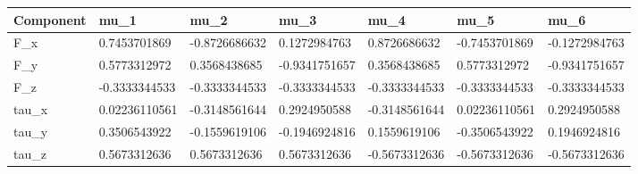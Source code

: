 \begin{tabular}{@{}lllllll@{}}
\toprule
Component & mu\_1 & mu\_2 & mu\_3 & mu\_4 & mu\_5 & mu\_6 \\
\midrule
F\_x & 0.7453701869 & -0.8726686632 & 0.1272984763 & 0.8726686632 & -0.7453701869 & -0.1272984763 \\
F\_y & 0.5773312972 & 0.3568438685 & -0.9341751657 & 0.3568438685 & 0.5773312972 & -0.9341751657 \\
F\_z & -0.3333344533 & -0.3333344533 & -0.3333344533 & -0.3333344533 & -0.3333344533 & -0.3333344533 \\
tau\_x & 0.02236110561 & -0.3148561644 & 0.2924950588 & -0.3148561644 & 0.02236110561 & 0.2924950588 \\
tau\_y & 0.3506543922 & -0.1559619106 & -0.1946924816 & 0.1559619106 & -0.3506543922 & 0.1946924816 \\
tau\_z & 0.5673312636 & 0.5673312636 & 0.5673312636 & -0.5673312636 & -0.5673312636 & -0.5673312636 \\
\bottomrule
\end{tabular}
